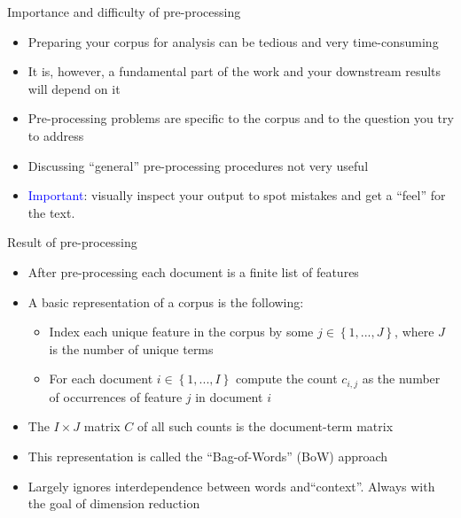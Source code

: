\documentclass[english]{beamer}
\begin{document}
\begin{frame}{Importance and difficulty of pre-processing}

\begin{itemize}
\setlength{\itemsep}{1.2em}
\item Preparing your corpus for analysis can be tedious and very time-consuming

\item It is, however, a fundamental part of the work and your downstream results will depend on it

\item Pre-processing problems are specific to the corpus and to the question you try to address

\item Discussing ``general'' pre-processing procedures not very useful 

\pause

\item \textcolor{blue}{Important}: visually inspect your output to spot mistakes and get a ``feel'' for the text.
\end{itemize}

\end{frame}

\begin{frame}{Result of pre-processing}

\begin{itemize}
\setlength{\itemsep}{1.2em}
\item After pre-processing each document is a finite list of features

\item A basic representation of a corpus is the following:
\vspace{4pt}
\begin{itemize}
\setlength{\itemsep}{0.7em}

\item Index each unique feature in the corpus by some $j\in \left\{
1,...,J\right\} $, where $J$ is the number of unique terms

\item For each document $i\in \left\{ 1,...,I\right\} $ compute the count $%
c_{i,j}$ as the number of occurrences of feature $j$ in document $i$
\end{itemize}

\item The $I\times J$ matrix $C$ of all such counts is the document-term matrix

\item This representation is called the ``Bag-of-Words'' (BoW) approach

\item Largely ignores interdependence between words and``context''. Always with the goal of dimension reduction


\end{itemize}
\end{frame}
\end{document}
